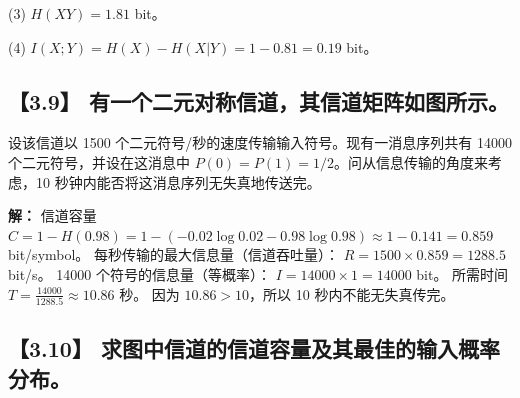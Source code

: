 \documentclass[11pt, a4paper]{article}
\begin{document}
(3) $H(XY) = 1.81$ bit。

(4) $I(X;Y) = H(X) - H(X|Y) = 1 - 0.81 = 0.19$ bit。

\subsection*{【3.9】 有一个二元对称信道，其信道矩阵如图所示。}
设该信道以 1500 个二元符号/秒的速度传输输入符号。现有一消息序列共有 14000 个二元符号，并设在这消息中 $P(0)=P(1)=1/2$。问从信息传输的角度来考虑，10 秒钟内能否将这消息序列无失真地传送完。

\begin{center}
\end{center}

\textbf{解：}
信道容量 $C = 1 - H(0.98) = 1 - (-0.02\log0.02 - 0.98\log0.98) \approx 1 - 0.141 = 0.859$ bit/symbol。
每秒传输的最大信息量（信道吞吐量）：
$R = 1500 \times 0.859 = 1288.5$ bit/s。
14000 个符号的信息量（等概率）：
$I = 14000 \times 1 = 14000$ bit。
所需时间 $T = \frac{14000}{1288.5} \approx 10.86$ 秒。
因为 $10.86 > 10$，所以 10 秒内不能无失真传完。

\subsection*{【3.10】 求图中信道的信道容量及其最佳的输入概率分布。}
\end{document}
